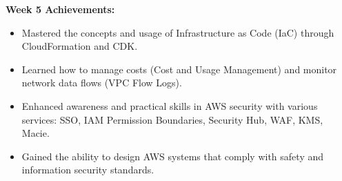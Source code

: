 \vspace{0.5em}\noindent\textbf{Week 5 Achievements:}\par

\begin{itemize}
\tightlist
\item
  Mastered the concepts and usage of Infrastructure as Code (IaC)
  through CloudFormation and CDK.
\item
  Learned how to manage costs (Cost and Usage Management) and monitor
  network data flows (VPC Flow Logs).
\item
  Enhanced awareness and practical skills in AWS security with various
  services: SSO, IAM Permission Boundaries, Security Hub, WAF, KMS,
  Macie.
\item
  Gained the ability to design AWS systems that comply with safety and
  information security standards.
\end{itemize}
